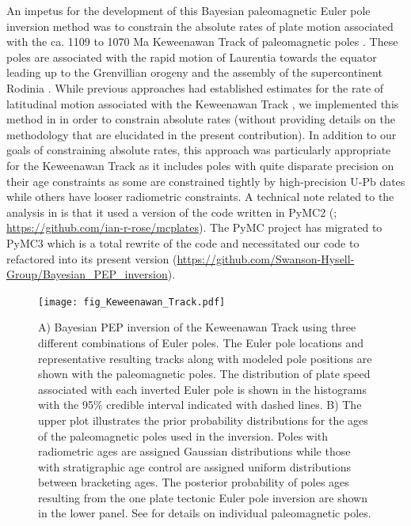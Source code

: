 \documentclass[11pt,letterpaper]{article}
\begin{document}
An impetus for the development of this Bayesian paleomagnetic Euler pole inversion method was to constrain the absolute rates of plate motion associated with the ca. 1109 to 1070 Ma Keweenawan Track of paleomagnetic poles \citep{Swanson-Hysell2009a, Swanson-Hysell2019a}. These poles are associated with the rapid motion of Laurentia towards the equator leading up to the Grenvillian orogeny and the assembly of the supercontinent Rodinia \citep{Swanson-Hysell2021a}. While previous approaches had established estimates for the rate of latitudinal motion associated with the Keweenawan Track \citep{Davis1997a, Swanson-Hysell2014b}, we implemented this method in \cite{Swanson-Hysell2019a} in order to constrain absolute rates (without providing details on the methodology that are elucidated in the present contribution). In addition to our goals of constraining absolute rates, this approach was particularly appropriate for the Keweenawan Track as it includes poles with quite disparate precision on their age constraints as some are constrained tightly by high-precision U-Pb dates \citep[e.g.][]{Fairchild2017a} while others have looser radiometric constraints. A technical note related to the analysis in \cite{Swanson-Hysell2019a} is that it used a version of the code written in PyMC2 (\citealp{Patil2010a}; \url{https://github.com/ian-r-rose/mcplates}). The PyMC project has migrated to PyMC3 which is a total rewrite of the code \citep{Salvatier2016a} and necessitated our code to refactored into its present version (\url{https://github.com/Swanson-Hysell-Group/Bayesian_PEP_inversion}). 

\begin{figure}
\centering
\texttt{[image: fig\_Keweenawan\_Track.pdf]}
\caption{A) Bayesian PEP inversion of the Keweenawan Track using three different combinations of Euler poles. The Euler pole locations and representative resulting tracks along with modeled pole positions are shown with the paleomagnetic poles. The distribution of plate speed associated with each inverted Euler pole is shown in the histograms with the 95$\%$ credible interval indicated with dashed lines. B) The upper plot illustrates the prior probability distributions for the ages of the paleomagnetic poles used in the inversion. Poles with radiometric ages are assigned Gaussian distributions while those with stratigraphic age control are assigned uniform distributions between bracketing ages. The posterior probability of poles ages resulting from the one plate tectonic Euler pole inversion are shown in the lower panel. See \cite{Swanson-Hysell2019a} for details on individual paleomagnetic poles.}
\label{fig:Keweenawan_Track}
\end{figure}
\end{document}
